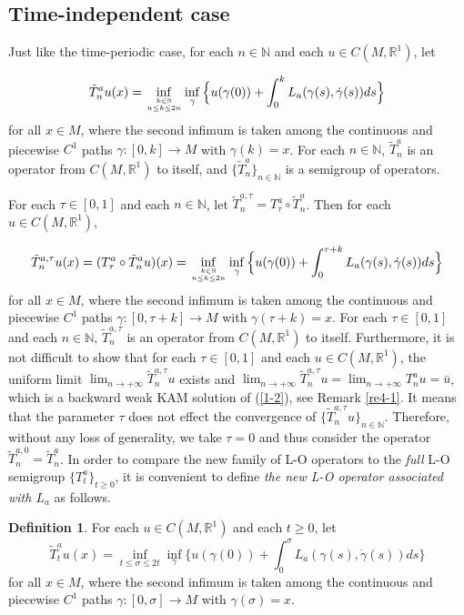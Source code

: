 \documentclass{amsart}[12pt]
\theoremstyle{definition}
\newtheorem{definition}[theorem]{Definition}
\theoremstyle{remark}
\numberwithin{equation}{section}
\begin{document}
\vskip0.2cm

\subsection{Time-independent case}
Just like the time-periodic case, for each $n\in\mathbb{N}$ and
each $u\in C(M,\mathbb{R}^1)$, let

\[
\tilde{T}_n^au(x)=\inf_{k\in\mathbb{N} \atop n\leq k\leq
2n}\inf_{\gamma}\Big\{u(\gamma(0))+\int_{0}^k
L_a(\gamma(s),\dot{\gamma}(s))ds\Big\}
\]
for all $x\in M$, where the second infimum is taken among the
continuous and piecewise $C^1$ paths $\gamma:[0,k]\rightarrow M$
with $\gamma(k)=x$. For each $n\in\mathbb{N}$, $\tilde{T}_n^a$ is
an operator from $C(M,\mathbb{R}^1)$ to itself, and
$\{\tilde{T}_n^a\}_{n\in\mathbb{N}}$ is a semigroup of operators.

For each $\tau\in[0,1]$ and each $n\in \mathbb{N}$, let
$\tilde{T}_n^{a,\tau}=T_\tau^a\circ\tilde{T}_n^a$. Then for each
$u\in C(M,\mathbb{R}^1)$,

\[
\tilde{T}_n^{a,\tau} u(x)=(T_\tau^a\circ\tilde{T}_n^au)(x)=
\inf_{k\in\mathbb{N} \atop n\leq k\leq
2n}\inf_{\gamma}\Big\{u(\gamma(0))+\int_{0}^{\tau+k}
L_a(\gamma(s),\dot{\gamma}(s))ds\Big\}
\]
for all $x\in M$, where the second infimum is taken among the
continuous and piecewise $C^1$ paths $\gamma:[0,\tau+k]\rightarrow
M$ with $\gamma(\tau+k)=x$. For each $\tau\in[0,1]$ and each $n\in
\mathbb{N}$, $\tilde{T}_n^{a,\tau}$ is an operator from
$C(M,\mathbb{R}^1)$ to itself. Furthermore, it is not difficult to
show that for each $\tau\in[0,1]$ and each $u\in
C(M,\mathbb{R}^1)$, the uniform limit
$\lim_{n\to+\infty}\tilde{T}_n^{a,\tau}u$ exists and
$\lim_{n\to+\infty}\tilde{T}_n^{a,\tau}u=\lim_{n\to+\infty}T_n^au=\bar{u}$,
which is a backward weak KAM solution of (\ref{1-2}), see Remark
\ref{re4-1}. It means that the parameter $\tau$ does not effect
the convergence of $\{\tilde{T}_n^{a,\tau}u\}_{n\in\mathbb{N}}$.
Therefore, without any loss of generality, we take $\tau=0$ and
thus consider the operator $\tilde{T}_n^{a,0}=\tilde{T}_n^a$. In
order to compare the new family of L-O operators to the {\em full}
L-O semigroup $\{T^a_t\}_{t\geq 0}$, it is convenient to define
{\em the new L-O operator associated with $L_a$} as follows.

\begin{definition}\label{def2}
For each $u\in C(M,\mathbb{R}^1)$ and each $t\geq0$, let
\[
\tilde{T}^a_tu(x)=\inf_{t\leq \sigma\leq
2t}\inf_{\gamma}\Big\{u(\gamma(0))+\int_0^\sigma
L_a(\gamma(s),\dot{\gamma}(s))ds\Big\}
\]
for all $x\in M$, where the second infimum is taken among the
continuous and piecewise $C^1$ paths $\gamma:[0,\sigma]\rightarrow
M$ with $\gamma(\sigma)=x$.
\end{definition}
\end{document}
